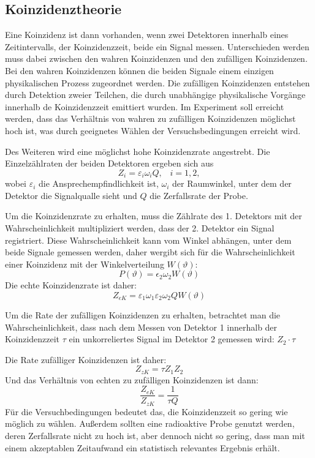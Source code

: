 \documentclass[11pt]{scrartcl}
\begin{document}
\subsection{Koinzidenztheorie}
Eine Koinzidenz ist dann vorhanden, wenn zwei Detektoren
innerhalb eines Zeitintervalls, der Koinzidenzzeit, beide ein 
Signal messen. Unterschieden werden muss dabei zwischen den 
wahren Koinzidenzen und den zufälligen Koinzidenzen. Bei den wahren
Koinzidenzen können die beiden Signale einem einzigen physikalischen
Prozess zugeordnet werden. Die zufälligen Koinzidenzen entstehen
durch Detektion zweier Teilchen, die durch unabhängige physikalische
Vorgänge innerhalb de Koinzidenzzeit emittiert wurden. Im Experiment
soll erreicht werden, dass das Verhältnis von wahren zu zufälligen 
Koinzidenzen möglichst hoch ist, was durch geeignetes Wählen der 
Versuchsbedingungen erreicht wird.

Des Weiteren wird eine möglichst hohe Koinzidenzrate angestrebt. 
Die Einzelzählraten der beiden Detektoren ergeben sich aus
\begin{equation}
 Z_i=\varepsilon_i \omega_i Q, \;\;\; i=1,2,
\end{equation}
wobei $\varepsilon_i$ die Ansprechempfindlichkeit ist, $\omega_i$
der Raumwinkel, unter dem der Detektor die Signalqualle sieht und
$Q$ die Zerfallsrate der Probe. 

Um die Koinzidenzrate zu erhalten, muss die Zählrate des 1. Detektors
mit der Wahrscheinlichkeit multipliziert werden, dass der 2. 
Detektor ein Signal registriert. Diese Wahrscheinlichkeit kann 
vom Winkel abhängen, unter dem beide Signale gemessen werden, daher
wergibt sich für die Wahrscheinlichkeit einer Koinzidenz mit der 
Winkelverteilung $W(\vartheta)$:
\begin{equation}
 P(\vartheta)=\epsilon_2\omega_2 W(\vartheta)
\end{equation}
Die echte Koinzidenzrate ist daher:
\begin{equation}
 Z_{eK}=\varepsilon_1 \omega_1 \varepsilon_2 \omega_2 Q W(\vartheta)
\end{equation}

Um die Rate der zufälligen Koinzidenzen zu erhalten, betrachtet man die Wahrscheinlichkeit, dass
nach dem Messen von Detektor 1 innerhalb der Koinzidenzzeit $\tau$ ein unkorreliertes Signal im Detektor 2 
gemessen wird: $Z_2\cdot \tau$

Die Rate zufälliger Koinzidenzen ist daher:
\begin{equation}
 Z_{zK}=\tau Z_1Z_2
\end{equation}
Und das Verhältnis von echten zu zufälligen Koinzidenzen ist dann:
\begin{equation}
 \frac{Z_{eK}}{Z_{zK}}=\frac{1}{\tau Q}
\end{equation}
Für die Versuchbedingungen bedeutet das, die Koinzidenzzeit so gering wie möglich zu wählen.
Außerdem sollten eine radioaktive Probe genutzt werden, deren Zerfallsrate nicht zu hoch ist,
aber dennoch nicht so gering,
dass man mit einem akzeptablen Zeitaufwand ein statistisch relevantes Ergebnis erhält.
\end{document}
